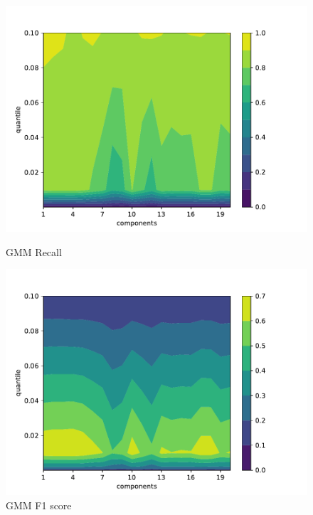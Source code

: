 \begin{figure}[!htb]
    \begin{minipage}[t]{0.5\textwidth}
        \vspace{0pt}
        \includegraphics[width=\textwidth]{images/gmm-recall.pdf}
        \caption{GMM Recall}
    \end{minipage}
    \hfill
    \begin{minipage}[t]{0.5\textwidth}
        \vspace{0pt}
        \includegraphics[width=\textwidth]{images/gmm-f1.pdf}
        \caption{GMM F1 score}
    \end{minipage}
\end{figure}

\noindent
  

